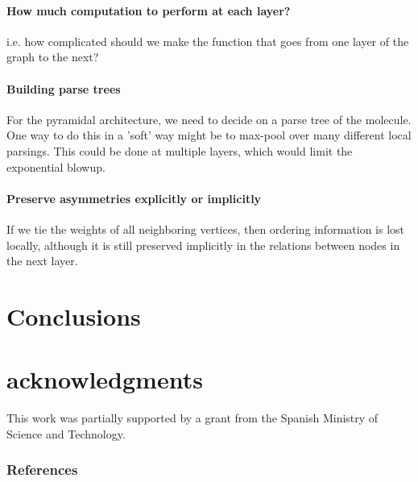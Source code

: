 \documentclass{article} %
\begin{document}
\paragraph{How much computation to perform at each layer?}
i.e. how complicated should we make the function that goes from one layer of the graph to the next?

\paragraph{Building parse trees}
For the pyramidal architecture, we need to decide on a parse tree of the molecule.
One way to do this in a 'soft' way might be to max-pool over many different local parsings.
This could be done at multiple layers, which would limit the exponential blowup.

\paragraph{Preserve asymmetries explicitly or implicitly}
If we tie the weights of all neighboring vertices, then ordering information is lost locally, although it is still preserved implicitly in the relations between nodes in the next layer.


\section{Conclusions}


\section*{acknowledgments}
This work was partially supported by a grant from the Spanish Ministry of Science and Technology.



\subsubsection*{References}



\end{document}
